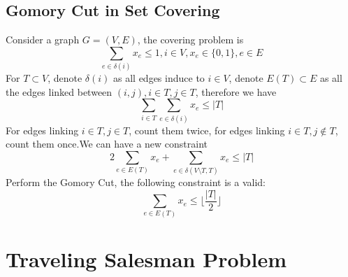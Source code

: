 			\subsection{Gomory Cut in Set Covering}
				Consider a graph $G=(V, E)$, the covering problem is
				\begin{equation}
					\sum_{e\in \delta(i)}x_e \le 1, i\in V, x_e\in \{0, 1\}, e\in E
				\end{equation}
				For $T\subset V$, denote $\delta(i)$ as all edges induce to $i\in V$, denote $E(T) \subset E$ as all the edges linked between $(i, j), i\in T, j\in T$, therefore we have
				\begin{equation}
					\sum_{i\in T}\sum_{e\in \delta(i)}x_e \le |T| 
				\end{equation}
				For edges linking $i \in T, j \in T$, count them twice, for edges linking $i\in T, j\notin T$, count them once.We can have a new constraint
				\begin{equation}
					2\sum_{e\in E(T)}x_e + \sum_{e\in \delta(V\setminus T, T)}x_e \le |T| 
				\end{equation}
				Perform the Gomory Cut, the following constraint is a valid:
				\begin{equation}
					\sum_{e\in E(T)}x_e \le \lfloor \frac{|T|}2 \rfloor 
				\end{equation}
							
		\section{Traveling Salesman Problem}
